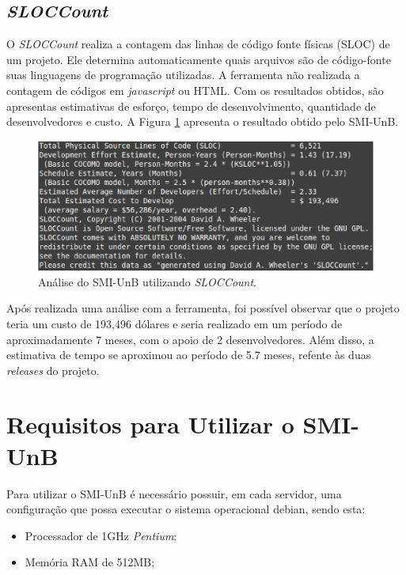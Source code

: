 \subsection{\textit{SLOCCount}}
O \textit{SLOCCount}\cite{sloccount} realiza a contagem das linhas de código fonte físicas (SLOC) de um projeto. Ele determina automaticamente quais arquivos são de código-fonte suas linguagens de programação utilizadas. A ferramenta não realizada a contagem de códigos em \textit{javascript} ou HTML. Com os resultados obtidos, são apresentas estimativas de esforço, tempo de desenvolvimento, quantidade de desenvolvedores e custo. A Figura \ref{sloc} apresenta o resultado obtido pelo SMI-UnB.

\begin{figure}[!h]
    \centering
    \includegraphics[keepaspectratio=true,scale=0.7]{figuras/sloc.eps}
    \caption{Análise do SMI-UnB utilizando \textit{SLOCCount}.}
    \label{sloc}
\end{figure}

Após realizada uma análise com a ferramenta, foi possível observar que o projeto teria um custo de 193,496 dólares e seria realizado em um período de aproximadamente 7 meses, com o apoio de 2 desenvolvedores. Além disso, a estimativa de tempo se aproximou ao período de 5.7 meses, refente às duas \textit{releases} do projeto.

\section{Requisitos para Utilizar o SMI-UnB}
    Para utilizar o SMI-UnB é necessário possuir, em cada servidor, uma configuração que possa executar o sistema operacional debian, sendo esta:

    \begin{itemize}
        \item Processador de 1GHz \textit{Pentium};
        \item Memória RAM de 512MB;
    \end{itemize}


